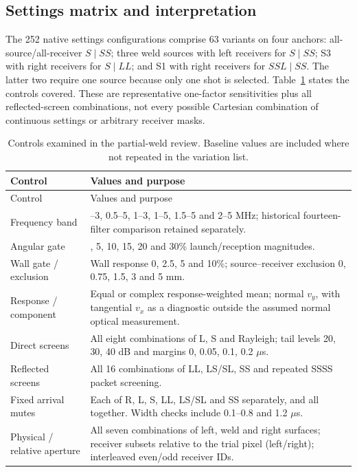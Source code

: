 \subsection{Settings matrix and interpretation}
The 252 native settings configurations comprise 63 variants on four anchors: all-source/all-receiver $S\mid SS$; three weld sources with left receivers for $S\mid SS$; S3 with right receivers for $S\mid LL$; and S1 with right receivers for $SSL\mid SS$. The latter two require one source because only one shot is selected. Table~\ref{saftapp:control_inventory} states the controls covered. These are representative one-factor sensitivities plus all reflected-screen combinations, not every possible Cartesian combination of continuous settings or arbitrary receiver masks.

\begin{longtable}{@{}>{\raggedright\arraybackslash}p{.27\linewidth}>{\raggedright\arraybackslash}p{.67\linewidth}@{}}
\caption{Controls examined in the partial-weld review. Baseline values are included where not repeated in the variation list.}\label{saftapp:control_inventory}\\
\toprule Control & Values and purpose\\\midrule\endfirsthead
\toprule Control & Values and purpose\\\midrule\endhead
Frequency band & 0.5--3, 0.5--5, 1--3, 1--5, 1.5--5 and 2--5 MHz; historical fourteen-filter comparison retained separately.\\
Angular gate & 0, 5, 10, 15, 20 and 30\% launch/reception magnitudes.\\
Wall gate / exclusion & Wall response 0, 2.5, 5 and 10\%; source--receiver exclusion 0, 0.75, 1.5, 3 and 5 mm.\\
Response / component & Equal or complex response-weighted mean; normal $v_y$, with tangential $v_x$ as a diagnostic outside the assumed normal optical measurement.\\
Direct screens & All eight combinations of L, S and Rayleigh; tail levels 20, 30, 40 dB and margins 0, 0.05, 0.1, 0.2 $\mu$s.\\
Reflected screens & All 16 combinations of LL, LS/SL, SS and repeated SSSS packet screening.\\
Fixed arrival mutes & Each of R, L, S, LL, LS/SL and SS separately, and all together. Width checks include 0.1--0.8 and 1.2 $\mu$s.\\
Physical / relative aperture & All seven combinations of left, weld and right surfaces; receiver subsets relative to the trial pixel (left/right); interleaved even/odd receiver IDs.\\

\end{longtable}
